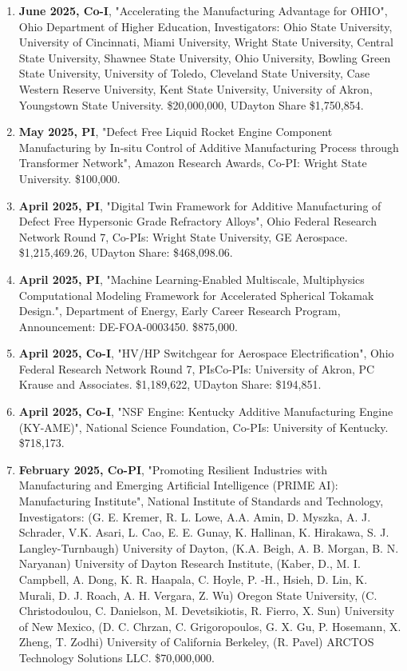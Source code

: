 \documentclass[11pt, letterpaper]{article}
\begin{document}
\begin{enumerate}[label=\arabic*., itemsep=-1pt, topsep=2pt]
        \item \textbf{June 2025, Co-I}, "Accelerating the Manufacturing Advantage for OHIO", Ohio Department of Higher Education, Investigators: Ohio State University, University of Cincinnati, Miami University, Wright State University, Central State University, Shawnee State University, Ohio University, Bowling Green State University, University of Toledo, Cleveland State University, Case Western Reserve University, Kent State University, University of Akron, Youngstown State University. \$20,000,000, UDayton Share \$1,750,854.
        \item \textbf{May 2025, PI}, "Defect Free Liquid Rocket Engine Component Manufacturing by In-situ Control of Additive Manufacturing Process through Transformer Network", Amazon Research Awards, Co-PI: Wright State University. \$100,000.
        \item \textbf{April 2025, PI}, "Digital Twin Framework for Additive Manufacturing of Defect Free Hypersonic Grade Refractory Alloys", Ohio Federal Research Network Round 7, Co-PIs: Wright State University, GE Aerospace. \$1,215,469.26, UDayton Share: \$468,098.06.
        \item \textbf{April 2025, PI}, "Machine Learning-Enabled Multiscale, Multiphysics Computational Modeling Framework for Accelerated Spherical Tokamak Design.", Department of Energy, Early Career Research Program, Announcement: DE-FOA-0003450. \$875,000.
        \item \textbf{April 2025, Co-I}, "HV/HP Switchgear for Aerospace Electrification", Ohio Federal Research Network Round 7, PIs\/Co-PIs: University of Akron, PC Krause and Associates. \$1,189,622, UDayton Share: \$194,851.
        \item \textbf{April 2025, Co-I}, "NSF Engine: Kentucky Additive Manufacturing Engine (KY-AME)", National Science Foundation, Co-PIs: University of Kentucky. \$718,173.
        \item \textbf{February 2025, Co-PI}, "Promoting Resilient Industries with Manufacturing and Emerging Artificial Intelligence (PRIME AI): Manufacturing Institute", National Institute of Standards and Technology, Investigators: (G. E. Kremer, R. L. Lowe, A.A. Amin, D. Myszka, A. J. Schrader, V.K. Asari, L. Cao, E. E. Gunay, K. Hallinan, K. Hirakawa, S. J. Langley-Turnbaugh) University of Dayton, (K.A. Beigh, A. B. Morgan, B. N. Naryanan) University of Dayton Research Institute, (Kaber, D., M. I. Campbell, A. Dong, K. R. Haapala, C. Hoyle, P. -H., Hsieh, D. Lin, K. Murali, D. J. Roach, A. H. Vergara, Z. Wu) Oregon State University, (C. Christodoulou, C. Danielson, M. Devetsikiotis, R. Fierro, X. Sun) University of New Mexico, (D. C. Chrzan, C. Grigoropoulos, G. X. Gu, P. Hosemann, X. Zheng, T. Zodhi) University of California Berkeley, (R. Pavel) ARCTOS Technology Solutions LLC. \$70,000,000.

\end{enumerate}
\end{document}
